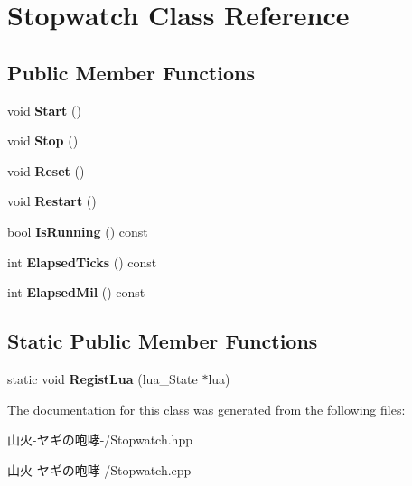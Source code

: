 \hypertarget{class_stopwatch}{}\section{Stopwatch Class Reference}
\label{class_stopwatch}
\subsection*{Public Member Functions}
\begin{DoxyCompactItemize}
\item 
void {\bfseries Start} ()\hypertarget{class_stopwatch_adb93923510f12409132445fc187d828f}{}\label{class_stopwatch_adb93923510f12409132445fc187d828f}

\item 
void {\bfseries Stop} ()\hypertarget{class_stopwatch_afb2754584ef39767d8182f2345cd9721}{}\label{class_stopwatch_afb2754584ef39767d8182f2345cd9721}

\item 
void {\bfseries Reset} ()\hypertarget{class_stopwatch_a6baf4754288ed0a3f0dc9fd1b5abe7c2}{}\label{class_stopwatch_a6baf4754288ed0a3f0dc9fd1b5abe7c2}

\item 
void {\bfseries Restart} ()\hypertarget{class_stopwatch_ae44f7de1455395f468ab5f7f99734521}{}\label{class_stopwatch_ae44f7de1455395f468ab5f7f99734521}

\item 
bool {\bfseries Is\+Running} () const \hypertarget{class_stopwatch_a7abb2202efcc65991afe91e0a64f5c67}{}\label{class_stopwatch_a7abb2202efcc65991afe91e0a64f5c67}

\item 
int {\bfseries Elapsed\+Ticks} () const \hypertarget{class_stopwatch_a830d251659cd7a8b6eecace6fa0e9e33}{}\label{class_stopwatch_a830d251659cd7a8b6eecace6fa0e9e33}

\item 
int {\bfseries Elapsed\+Mil} () const \hypertarget{class_stopwatch_a111c215578c4cf1d2800d2b1f29f5b3a}{}\label{class_stopwatch_a111c215578c4cf1d2800d2b1f29f5b3a}

\end{DoxyCompactItemize}
\subsection*{Static Public Member Functions}
\begin{DoxyCompactItemize}
\item 
static void {\bfseries Regist\+Lua} (lua\+\_\+\+State $\ast$lua)\hypertarget{class_stopwatch_a164866360f9b339431fad78b4cdd0914}{}\label{class_stopwatch_a164866360f9b339431fad78b4cdd0914}

\end{DoxyCompactItemize}


The documentation for this class was generated from the following files\+:\begin{DoxyCompactItemize}
\item 
山火-\/ヤギの咆哮-\//Stopwatch.\+hpp\item 
山火-\/ヤギの咆哮-\//Stopwatch.\+cpp\end{DoxyCompactItemize}

